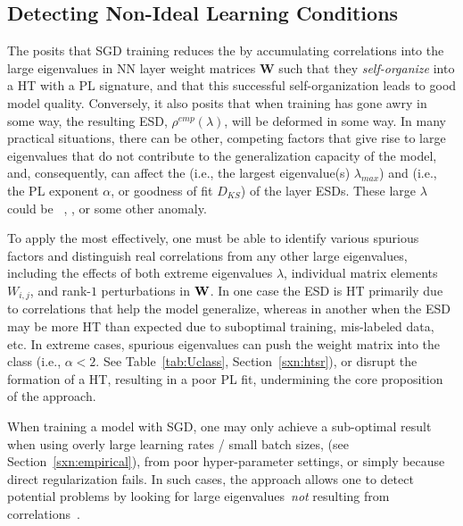 \subsection{Detecting Non-Ideal Learning Conditions}
\label{sxn:HT_ESDs}


The \HTSR \Phenomenology posits that SGD training reduces the \emph{\TrainingError} by accumulating correlations into the large eigenvalues
in NN layer weight matrices  $\mathbf{W}$ such that they \emph{self-organize} into a HT with a PL signature,
and that this successful self-organization leads to good model quality.
Conversely, it also posits that when training has gone awry in some way, the resulting ESD, $\rho^{emp}(\lambda)$, will
be deformed in some way.   
In many practical situations, there can be other, 
competing factors that give rise to large eigenvalues
that do not contribute to the generalization capacity of the model, and, consequently, 
can affect the \Scale (i.e., the largest eigenvalue(s) $\lambda_{max}$) 
and \Shape (i.e., the PL exponent $\alpha$, or goodness of fit $D_{KS}$) of the layer ESDs.
These large $\lambda$ could be \DragonKings~\cite{sornette2009dragonkings}, \emph{\CorrelationTraps}, or some other anomaly.

To apply the \HTSR \Phenomenology most effectively, one must be able to identify various spurious factors and
distinguish real correlations from any other large eigenvalues, including the effects of both
extreme eigenvalues $\lambda$, individual matrix elements $W_{i,j}$, and rank-$1$ perturbations in ${\mathbf{W}}$.
In one case the ESD is HT primarily due to correlations that help the model generalize, whereas
in another when the ESD may be more HT than expected due to suboptimal training, mis-labeled data, etc.
In extreme cases, spurious eigenvalues can push the weight matrix
into the \VeryHeavyTailed \Universality class (i.e., $\alpha<2$. See Table~\ref{tab:Uclass}, Section~\ref{sxn:htsr}), or
disrupt the formation of a HT, resulting in a poor PL fit, undermining the core proposition of the  \HTSR approach.

When training a model with SGD, one may only achieve  a sub-optimal result
when using overly large learning rates / small batch sizes, (see Section~\ref{sxn:empirical}),
from poor hyper-parameter settings,
or simply because direct regularization fails. In such cases, the \HTSR approach allows one to detect
potential problems by looking for large eigenvalues~\emph{not} resulting from correlations~\cite{GSZ20_TR}.

